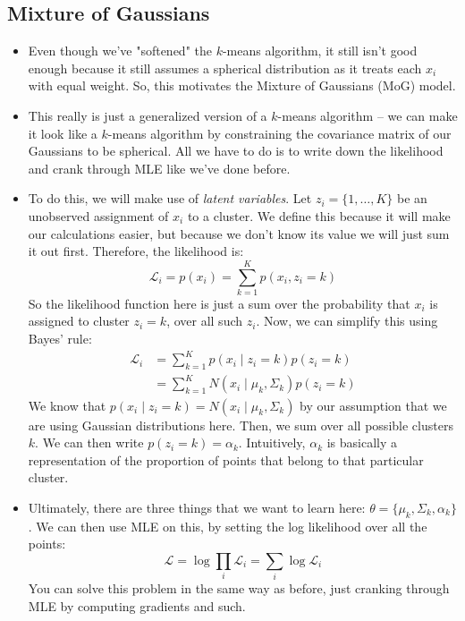 \subsection{Mixture of Gaussians}
\begin{itemize}
	\item Even though we've "softened" the \( k \)-means algorithm, it still isn't good enough because it
		still assumes a spherical distribution as it treats each \( x_i \) with equal weight. So, this
		motivates the Mixture of Gaussians (MoG) model. 
	\item This really is just a generalized version of a \( k \)-means algorithm -- we can make it look like
		a \( k \)-means algorithm by constraining the covariance matrix of our Gaussians to be spherical.  
		All we have to do is to write down the likelihood and crank through MLE like we've done before. 
	\item To do this, we will make use of \textit{latent variables}. Let \( z_i = \{1, \dots, K\} \) be an
		unobserved assignment of \( x_i \) to a cluster. We define this because it will make our calculations
		easier, but because we don't know its value we will just sum it out first. Therefore, the likelihood
		is:
		\[
			\mathcal{L}_i = p(x_i) = \sum_{k = 1}^{K} p(x_i, z_i = k)
		\]
		So the likelihood function here is just a sum over the probability that \( x_i \) is assigned to
		cluster \( z_i = k \), over all such \( z_i \). Now, we can simplify this using Bayes' rule:
		\begin{align*}
			\mathcal{L}_i &= \sum_{k = 1}^{K} p(x_i \mid z_i = k) p(z_i = k) \\ 
			&= \sum_{k = 1}^{K} N(x_i \mid \mu_k, \Sigma_k) p(z_i = k)
		\end{align*} 
		We know that \( p(x_i \mid z_i = k) = N(x_i \mid \mu_k, \Sigma_k) \) by our assumption that we are
		using Gaussian distributions here. Then, we sum over all possible clusters \( k \). We can then write
		\( p(z_i = k) = \alpha_k \). Intuitively, \( \alpha_k \) is basically a representation of the
		proportion of points that belong to that particular cluster. 
	\item Ultimately, there are three things that we want to learn here: \( \theta = \{\mu_k, \Sigma_k,
		\alpha_k\} \). We can then use MLE on this, by setting the log likelihood over all the points:
		\[
			\mathcal{L} = \log \prod_i \mathcal{L}_i = \sum_i \log \mathcal{L}_i
		\]
		You can solve this problem in the same way as before, just cranking through MLE by computing
		gradients and such.  
\end{itemize}
